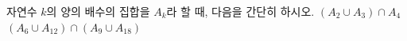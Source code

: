 자연수 $k$의 양의 배수의 집합을 $A_k$라 할 때, 다음을 간단히 하시오.
 $(A_2\cup A_3)\cap A_4$
 $(A_6\cup A_{12})\cap(A_9\cup A_{18})$
